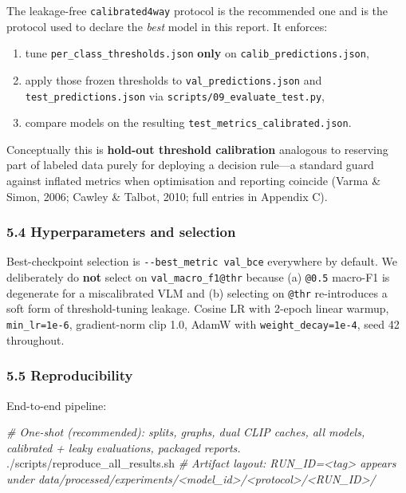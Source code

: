 \documentclass[
  11pt,
]{article}
\newenvironment{Shaded}{}{}
\newcommand{\CommentTok}[1]{\textcolor[rgb]{0.38,0.63,0.69}{\textit{#1}}}
\newcommand{\ExtensionTok}[1]{#1}
\providecommand{\tightlist}{%
  \setlength{\itemsep}{0pt}\setlength{\parskip}{0pt}}
\begin{document}
The leakage-free \texttt{calibrated4way} protocol is the recommended one
and is the protocol used to declare the \emph{best} model in this
report. It enforces:

\begin{enumerate}
\def\labelenumi{\arabic{enumi}.}
\tightlist
\item
  tune \texttt{per\_class\_thresholds.json} \textbf{only} on
  \texttt{calib\_predictions.json},
\item
  apply those frozen thresholds to \texttt{val\_predictions.json} and
  \texttt{test\_predictions.json} via
  \texttt{scripts/09\_evaluate\_test.py},
\item
  compare models on the resulting
  \texttt{test\_metrics\_calibrated.json}.
\end{enumerate}

Conceptually this is \textbf{hold-out threshold calibration} analogous
to reserving part of labeled data purely for deploying a decision
rule---a standard guard against inflated metrics when optimisation and
reporting coincide (Varma \& Simon, 2006; Cawley \& Talbot, 2010; full
entries in Appendix C).

\subsubsection{5.4 Hyperparameters and
selection}\label{hyperparameters-and-selection}

Best-checkpoint selection is \texttt{-\/-best\_metric\ val\_bce}
everywhere by default. We deliberately do \textbf{not} select on
\texttt{val\_macro\_f1@thr} because (a) \texttt{@0.5} macro-F1 is
degenerate for a miscalibrated VLM and (b) selecting on \texttt{@thr}
re-introduces a soft form of threshold-tuning leakage. Cosine LR with
2-epoch linear warmup, \texttt{min\_lr=1e-6}, gradient-norm clip 1.0,
AdamW with \texttt{weight\_decay=1e-4}, seed 42 throughout.

\subsubsection{5.5 Reproducibility}\label{reproducibility}

End-to-end pipeline:

\begin{Shaded}
\begin{Highlighting}[]
\CommentTok{\# One{-}shot (recommended): splits, graphs, dual CLIP caches, all models, calibrated + leaky evaluations, packaged reports.}
\ExtensionTok{./scripts/reproduce\_all\_results.sh}
\CommentTok{\# Artifact layout: RUN\_ID=\textless{}tag\textgreater{} appears under data/processed/experiments/\textless{}model\_id\textgreater{}/\textless{}protocol\textgreater{}/\textless{}RUN\_ID\textgreater{}/}
\end{Highlighting}
\end{Shaded}
\end{document}
